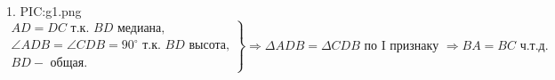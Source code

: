 1. {{PIC:g1.png}}\\
$\left.\begin{array}{l}AD=DC\text{ т.к. }BD\text{ медиана,}\\
\angle ADB=\angle CDB=90^\circ \text{ т.к. }BD\text{ высота,}\\
BD - \text{ общая.}   \end{array}\right\}\Rightarrow
\Delta ADB=\Delta CDB\text{ по I признаку }\Rightarrow BA=BC\text{ ч.т.д.} $\\
